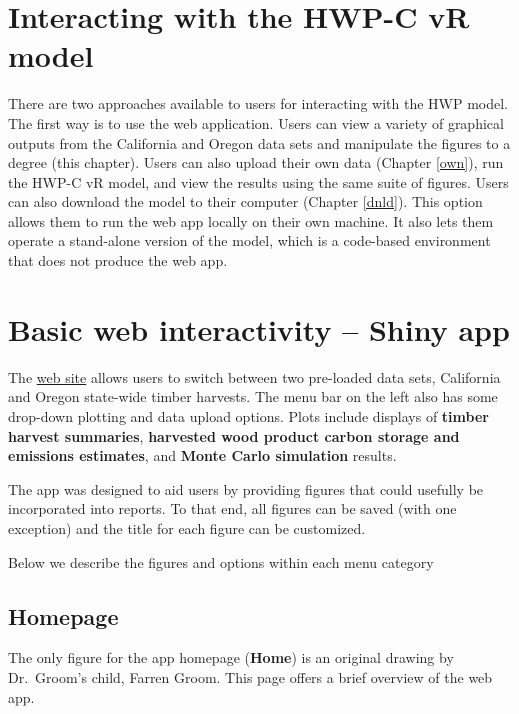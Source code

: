\documentclass[
  openany]{book}
\begin{document}
\hypertarget{app-sum}{%
\section{Interacting with the HWP-C vR model}\label{app-sum}}

There are two approaches available to users for interacting with the HWP model. The first way is to use the web application. Users can view a variety of graphical outputs from the California and Oregon data sets and manipulate the figures to a degree (this chapter). Users can also upload their own data (Chapter \ref{own}), run the HWP-C vR model, and view the results using the same suite of figures. Users can also download the model to their computer (Chapter \ref{dnld}). This option allows them to run the web app locally on their own machine. It also lets them operate a stand-alone version of the model, which is a code-based environment that does not produce the web app.

\hypertarget{app-shiny}{%
\section{Basic web interactivity -- Shiny app}\label{app-shiny}}

The \href{https://groomanalyticsllc.shinyapps.io/HWP-C-vR/}{web site} allows users to switch between two pre-loaded data sets, California and Oregon state-wide timber harvests. The menu bar on the left also has some drop-down plotting and data upload options. Plots include displays of \textbf{timber harvest summaries}, \textbf{harvested wood product carbon storage and emissions estimates}, and \textbf{Monte Carlo simulation} results.

The app was designed to aid users by providing figures that could usefully be incorporated into reports. To that end, all figures can be saved (with one exception) and the title for each figure can be customized.

Below we describe the figures and options within each menu category

\hypertarget{app-shiny-home}{%
\subsection{Homepage}\label{app-shiny-home}}

The only figure for the app homepage (\textbf{Home}) is an original drawing by Dr.~Groom's child, Farren Groom. This page offers a brief overview of the web app.
\end{document}
